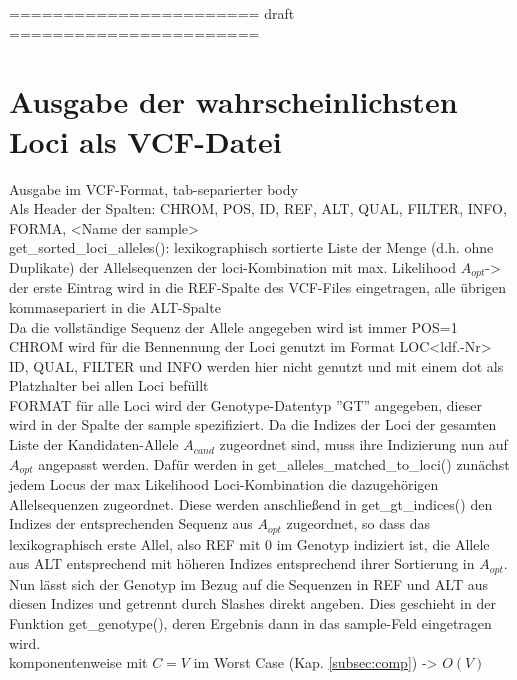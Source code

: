 \noindent======================= draft =======================\\


\section{Ausgabe der wahrscheinlichsten Loci als VCF-Datei} \label{sec:vcf}

Ausgabe im VCF-Format, tab-separierter body\\
Als Header der Spalten: CHROM, POS, ID, REF, ALT, QUAL, FILTER, INFO, FORMA, <Name der sample>\\
get\_sorted\_loci\_alleles(): lexikographisch sortierte Liste der Menge (d.h. ohne Duplikate) der Allelsequenzen der loci-Kombination mit max. Likelihood $A_{opt}$-> der erste Eintrag wird in die REF-Spalte des VCF-Files eingetragen, alle übrigen kommasepariert in die ALT-Spalte\\

Da die vollständige Sequenz der Allele angegeben wird ist immer POS=1
CHROM wird für die Bennennung der Loci genutzt im Format LOC<ldf.-Nr>
ID, QUAL, FILTER und INFO werden hier nicht genutzt und mit einem dot als Platzhalter bei allen Loci befüllt\\
FORMAT für alle Loci wird der Genotype-Datentyp ''GT'' angegeben, dieser wird in der Spalte der sample spezifiziert. Da die Indizes der Loci der gesamten Liste der Kandidaten-Allele $A_{cand}$ zugeordnet sind, muss ihre Indizierung nun auf $A_{opt}$ angepasst werden.  Dafür werden in get\_alleles\_matched\_to\_loci() zunächst jedem Locus der max Likelihood Loci-Kombination die dazugehörigen Allelsequenzen zugeordnet. Diese werden anschließend in get\_gt\_indices() den Indizes der entsprechenden Sequenz aus $A_{opt}$ zugeordnet, so dass das lexikographisch erste Allel, also REF mit 0 im Genotyp indiziert ist, die Allele aus ALT entsprechend mit höheren Indizes entsprechend ihrer Sortierung in $A_{opt}$. Nun lässt sich der Genotyp im Bezug auf die Sequenzen in REF und ALT aus diesen Indizes und getrennt durch Slashes direkt angeben. Dies geschieht in der Funktion get\_genotype(), deren Ergebnis dann in das sample-Feld eingetragen wird.\\



komponentenweise mit $C = V$ im Worst Case (Kap. \ref{subsec:comp}) -> $O(V)$
